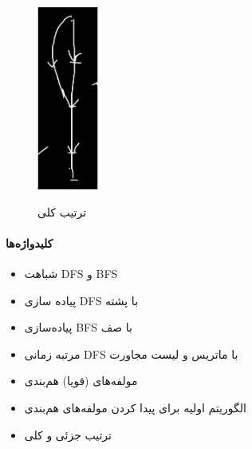 \begin{figure}
  \begin{center}
    \includegraphics[width=20mm]{s4.png}
    \label{khati}
	 \end{center}
	 \caption{ترتیب کلی}
\end{figure}

\paragraph{ 
کلیدواژه‌ها
}
\begin{itemize}
	\item شباهت DFS و BFS
	\item پیاده سازی DFS با پشته
	\item پیاده‌سازی BFS با صف
	\item مرتبه زمانی DFS با ماتریس و لیست مجاورت
	\item مولفه‌های (قویا) هم‌بندی
	\item الگوریتم اولیه برای پیدا کردن مولفه‌های هم‌بندی
	\item ترتیب جزئی و کلی
\end{itemize}
